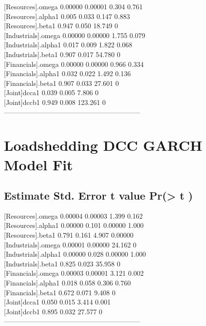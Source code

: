 \documentclass[11pt,preprint, authoryear]{elsarticle}
\numberwithin{equation}{section}
\numberwithin{figure}{section}
\numberwithin{table}{section}
\begin{document}
{[}Resources{]}.omega 0.00000 0.00001 0.304 0.761\\
{[}Resources{]}.alpha1 0.005 0.033 0.147 0.883\\
{[}Resources{]}.beta1 0.947 0.050 18.749 0\\
{[}Industrials{]}.omega 0.00000 0.00000 1.755 0.079\\
{[}Industrials{]}.alpha1 0.017 0.009 1.822 0.068\\
{[}Industrials{]}.beta1 0.907 0.017 54.780 0\\
{[}Financials{]}.omega 0.00000 0.00000 0.966 0.334\\
{[}Financials{]}.alpha1 0.032 0.022 1.492 0.136\\
{[}Financials{]}.beta1 0.907 0.033 27.601 0\\
{[}Joint{]}dcca1 0.039 0.005 7.806 0\\
{[}Joint{]}dccb1 0.949 0.008 123.261 0\\
------------------------------------------------------------

\hypertarget{loadshedding-dcc-garch-model-fit}{%
\section{Loadshedding DCC GARCH Model
Fit}\label{loadshedding-dcc-garch-model-fit}}

\hypertarget{estimate-std.-error-t-value-pr-t-1}{%
\subsection{Estimate Std. Error t value Pr(\textgreater{} \textbar{}
t\textbar{} )}\label{estimate-std.-error-t-value-pr-t-1}}

{[}Resources{]}.omega 0.00004 0.00003 1.399 0.162\\
{[}Resources{]}.alpha1 0.00000 0.101 0.00000 1.000\\
{[}Resources{]}.beta1 0.791 0.161 4.907 0.00000\\
{[}Industrials{]}.omega 0.00001 0.00000 24.162 0\\
{[}Industrials{]}.alpha1 0.00000 0.028 0.00000 1.000\\
{[}Industrials{]}.beta1 0.825 0.023 35.958 0\\
{[}Financials{]}.omega 0.00003 0.00001 3.121 0.002\\
{[}Financials{]}.alpha1 0.018 0.058 0.306 0.760\\
{[}Financials{]}.beta1 0.672 0.071 9.408 0\\
{[}Joint{]}dcca1 0.050 0.015 3.414 0.001\\
{[}Joint{]}dccb1 0.895 0.032 27.577 0\\
------------------------------------------------------------
\end{document}
